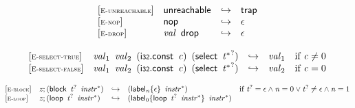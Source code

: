 \vspace{1ex}

\vspace{1ex}

$$
\begin{array}{@{}l@{}lcl@{}l@{}}
{[\textsc{\scriptsize E{-}unreachable}]} \quad & \mathsf{unreachable} &\hookrightarrow& \mathsf{trap} &  \\
{[\textsc{\scriptsize E{-}nop}]} \quad & \mathsf{nop} &\hookrightarrow& \epsilon &  \\
{[\textsc{\scriptsize E{-}drop}]} \quad & {\mathit{val}}~\,\mathsf{drop} &\hookrightarrow& \epsilon &  \\
\end{array}
$$

\vspace{1ex}

$$
\begin{array}{@{}l@{}lcl@{}l@{}}
{[\textsc{\scriptsize E{-}select{-}true}]} \quad & {\mathit{val}}_{{1}}~\,{\mathit{val}}_{{2}}~\,(\mathsf{i{\scriptstyle32}}.\mathsf{const}~\,{\mathit{c}})~\,(\mathsf{select}~\,{{{\mathit{t}}^\ast}^?}) &\hookrightarrow& {\mathit{val}}_{{1}} &\quad
  \mbox{if}~{\mathit{c}} \neq 0 \\
{[\textsc{\scriptsize E{-}select{-}false}]} \quad & {\mathit{val}}_{{1}}~\,{\mathit{val}}_{{2}}~\,(\mathsf{i{\scriptstyle32}}.\mathsf{const}~\,{\mathit{c}})~\,(\mathsf{select}~\,{{{\mathit{t}}^\ast}^?}) &\hookrightarrow& {\mathit{val}}_{{2}} &\quad
  \mbox{if}~{\mathit{c}} = 0 \\
\end{array}
$$

\vspace{1ex}

$$
\begin{array}{@{}l@{}lcl@{}l@{}}
{[\textsc{\scriptsize E{-}block}]} \quad & {\mathit{z}} ; (\mathsf{block}~\,{{\mathit{t}}^?}~\,{{\mathit{instr}}^\ast}) &\hookrightarrow& ({{\mathsf{label}}_{{\mathit{n}}}}{\{\epsilon\}}~\,{{\mathit{instr}}^\ast}) &\quad
  \mbox{if}~{{\mathit{t}}^?} = \epsilon \land {\mathit{n}} = 0 \lor {{\mathit{t}}^?} \neq \epsilon \land {\mathit{n}} = 1 \\
{[\textsc{\scriptsize E{-}loop}]} \quad & {\mathit{z}} ; (\mathsf{loop}~\,{{\mathit{t}}^?}~\,{{\mathit{instr}}^\ast}) &\hookrightarrow& ({{\mathsf{label}}_{0}}{\{\mathsf{loop}~\,{{\mathit{t}}^?}~\,{{\mathit{instr}}^\ast}\}}~\,{{\mathit{instr}}^\ast}) &  \\
\end{array}
$$

